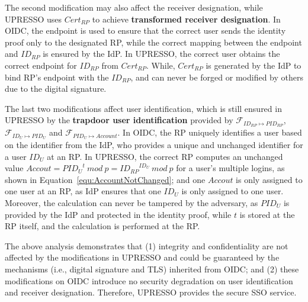 The second modification may also affect the receiver designation, while UPRESSO uses $Cert_{RP}$ to achieve \textbf{transformed receiver designation}.
In OIDC, the endpoint is used to ensure that the correct user sends the identity proof only to the designated RP, while the correct mapping between the endpoint and $ID_{RP}$ is ensured by the IdP.
In UPRESSO, the correct user obtains the correct endpoint for $ID_{RP}$ from $Cert_{RP}$. While,  $Cert_{RP}$ is generated by the IdP to bind RP's endpoint with the $ID_{RP}$, and can never be forged or modified by others due to the digital signature.

The last two modifications affect user identification, which is still ensured in UPRESSO by the \textbf{trapdoor user identification} provided by $\mathcal{F}_{ID_{RP} \mapsto PID_{RP}}$, $\mathcal{F}_{ID_{U} \mapsto PID_{U}}$ and $\mathcal{F}_{PID_{U} \mapsto Account}$.
In OIDC, the RP uniquely identifies a user based on the identifier from the IdP, who provides a unique and unchanged identifier for a user $ID_U$ at an RP.
In UPRESSO,  the correct RP  computes an unchanged value $Accout = {PID_U}^t\ mod\ p = {ID_{RP}}^{ID_U}\ mod\ p$  for a user's multiple logins, as shown in Equation~\ref{equ:AccountNotChanged};
 and one $Accout$ is only assigned to one user at an RP,  as IdP ensures that one $ID_U$ is only assigned to one user.
Moreover, the calculation can never be tampered by the adversary,  as  $PID_U$ is provided by the IdP and protected in the identity proof, while $t$ is stored at the RP itself, and the calculation is performed at the RP.

The above analysis demonstrates that (1) integrity and confidentiality are not affected by the modifications in UPRESSO and could be  guaranteed by the mechanisms (i.e., digital signature and TLS) inherited from OIDC; and (2) these modifications on OIDC introduce no security degradation on user identification and receiver designation.
Therefore, UPRESSO provides the secure SSO service.


